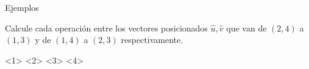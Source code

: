     \begin{frame}{}
        \begin{figure}
            \centering
        \end{figure}
    \end{frame}
    \begin{frame}{Ejemplos}
        \begin{example}
            Calcule cada operación entre los vectores posicionados $\hat{u},\hat{v}$ que van de $(2,4)$ a $(1,3)$ y de $(1,4)$ a $(2,3)$ respectivamente.
            \begin{itemize}
                <1>
                <2>
                <3>
                <4>
            \end{itemize}
        \end{example}
    \end{frame}
